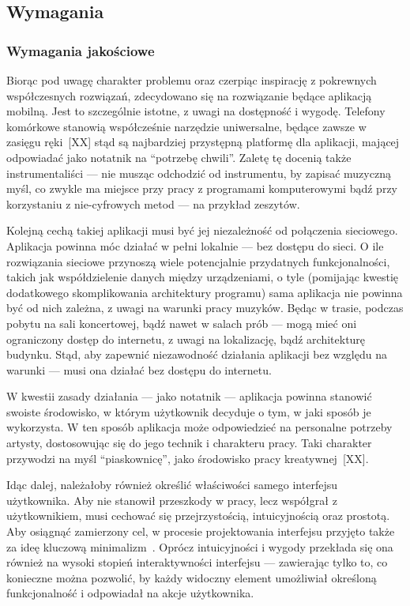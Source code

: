 \documentclass[12pt]{article}
\begin{document}
\subsection{Wymagania}
\subsubsection{Wymagania jakościowe}
Biorąc pod uwagę charakter problemu oraz czerpiąc inspirację z pokrewnych współczesnych rozwiązań,
zdecydowano się na rozwiązanie będące aplikacją mobilną.
Jest to szczególnie istotne, z uwagi na dostępność i wygodę.
Telefony komórkowe stanowią współcześnie narzędzie uniwersalne, będące zawsze w zasięgu ręki~[XX]
stąd są najbardziej przystępną platformę dla aplikacji, mającej odpowiadać jako notatnik na \enquote{potrzebę chwili}.
Zaletę tę docenią także instrumentaliści — nie musząc odchodzić od instrumentu, by zapisać muzyczną myśl,
co zwykle ma miejsce przy pracy z programami komputerowymi bądź przy korzystaniu z nie-cyfrowych metod
— na przykład zeszytów.

Kolejną cechą takiej aplikacji musi być jej niezależność od połączenia sieciowego.
Aplikacja powinna móc działać w pełni lokalnie — bez dostępu do sieci.
O ile rozwiązania sieciowe przynoszą wiele potencjalnie przydatnych funkcjonalności,
takich jak współdzielenie danych między urządzeniami,
o tyle (pomijając kwestię dodatkowego skomplikowania architektury programu)
sama aplikacja nie powinna być od nich zależna, z uwagi na warunki pracy muzyków.
Będąc w trasie, podczas pobytu na sali koncertowej, bądź nawet w salach prób — mogą mieć oni ograniczony dostęp do internetu,
z uwagi na lokalizację, bądź architekturę budynku.
Stąd, aby zapewnić niezawodność działania aplikacji bez względu na warunki — musi ona działać bez dostępu do internetu.

W kwestii zasady działania — jako notatnik — aplikacja powinna stanowić swoiste środowisko,
w którym użytkownik decyduje o tym, w jaki sposób je wykorzysta.
W ten sposób aplikacja może odpowiedzieć na personalne potrzeby artysty, dostosowując się do jego technik i charakteru pracy.
Taki charakter przywodzi na myśl \enquote{piaskownicę}, jako środowisko pracy kreatywnej~[XX].

Idąc dalej, należałoby również określić właściwości samego interfejsu użytkownika.
Aby nie stanowił przeszkody w pracy, lecz współgrał z użytkownikiem, musi cechować się przejrzystością,
intuicyjnością oraz prostotą.
Aby osiągnąć zamierzony cel, w procesie projektowania interfejsu przyjęto także za ideę kluczową minimalizm~\cite{minimalism}.
Oprócz intuicyjności i wygody przekłada się ona również na wysoki stopień interaktywności interfejsu — zawierając tylko to,
co konieczne można pozwolić, by każdy widoczny element umożliwiał określoną funkcjonalność i odpowiadał na akcje użytkownika.
\end{document}
